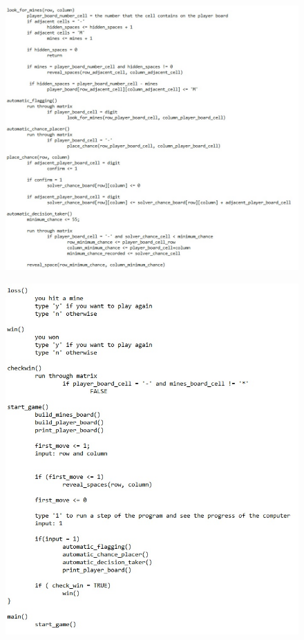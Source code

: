 \documentclass{article}
\begin{document}
\pagebreak
\begin{figure}[h!]
\includegraphics[scale=0.69]{4}
\label{fig:universe}
\end{figure}

\pagebreak
\begin{figure}[h!]
\includegraphics[scale=0.8]{5}
\label{fig:universe}
\end{figure}
\end{document}
